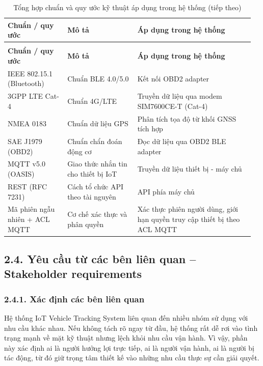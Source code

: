 \documentclass[a4paper]{extarticle}
\newcommand{\thesissettableid}[2]{%
  \renewcommand{\thetable}{#1}%
  \renewcommand{\theHtable}{#2}%
}
\begin{document}
{\thesissettableid{2.3.4A}{tab-ch2-tong-hop-thong-tin-ve-tieu-chuan-mo-ta-ap-dung-trong}
\def\LTcaptype{table}
\begin{longtable}{|L{0.231\linewidth}|L{0.278\linewidth}|L{0.455\linewidth}|}
\caption{Tổng hợp chuẩn và quy ước kỹ thuật áp dụng trong hệ thống}\label{tab:ch2-tong-hop-thong-tin-ve-tieu-chuan-mo-ta-ap-dung-trong}\\
\hline \textbf{Chuẩn / quy ước} & \textbf{Mô tả} & \textbf{Áp dụng trong hệ thống} \\
\hline
\endfirsthead
\caption[]{Tổng hợp chuẩn và quy ước kỹ thuật áp dụng trong hệ thống (tiếp theo)}\\
\hline \textbf{Chuẩn / quy ước} & \textbf{Mô tả} & \textbf{Áp dụng trong hệ thống} \\
\hline
\endhead
\hline
\endfoot
\endlastfoot
IEEE 802.15.1 (Bluetooth) & Chuẩn BLE 4.0/5.0 & Kết nối OBD2 adapter \\\hline
3GPP LTE Cat-4 & Chuẩn 4G/LTE & Truyền dữ liệu qua modem SIM7600CE-T
(Cat-4) \\\hline
NMEA 0183 & Chuẩn dữ liệu GPS & Phân tích tọa độ từ khối GNSS tích hợp \\\hline
SAE J1979 (OBD2) & Chuẩn chẩn đoán động cơ & Đọc dữ liệu qua OBD2 BLE
adapter \\\hline
MQTT v5.0 (OASIS) & Giao thức nhắn tin cho thiết bị IoT & Truyền dữ liệu thiết bị -
máy chủ \\\hline
REST (RFC 7231) & Cách tổ chức API theo tài nguyên & API phía máy chủ \\\hline
Mã phiên ngẫu nhiên + ACL MQTT & Cơ chế xác thực và phân quyền &
Xác thực phiên người dùng, giới hạn quyền truy cập thiết bị theo ACL
MQTT \\\hline
\end{longtable}
}


\subsection{2.4. Yêu cầu từ các bên liên quan -- Stakeholder
requirements}\label{24-yuxeau-cux1ea7u-tux1eeb-cuxe1c-buxean-liuxean-quan--stakeholder-requirements}

\subsubsection{2.4.1. Xác định các bên liên
quan}\label{241-xuxe1c-ux111ux1ecbnh-cuxe1c-buxean-liuxean-quan}

Hệ thống IoT Vehicle Tracking System liên quan đến nhiều nhóm sử dụng với
nhu cầu khác nhau. Nếu không tách rõ ngay từ đầu, hệ thống rất dễ rơi vào
tình trạng mạnh về mặt kỹ thuật nhưng lệch khỏi nhu cầu vận hành. Vì vậy,
phần này xác định ai là người hưởng lợi trực tiếp, ai là người vận hành,
ai là người bị tác động, từ đó giữ trọng tâm thiết kế vào những nhu cầu
thực sự cần giải quyết.
\end{document}
